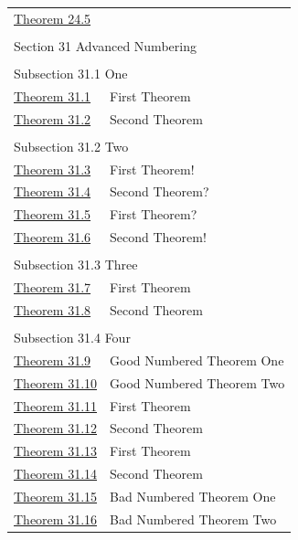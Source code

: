 \documentclass{sn-jnl}
\theoremstyle{thmstyleone}%
\theoremstyle{thmstyletwo}%
\theoremstyle{thmstylethree}%
\numberwithin{equation}{section}
\begin{document}
\begin{appendices}
\begin{longtable}[l]{ll}
\hyperref[theorem-detached]{Theorem 24.5}& \\
\multicolumn{2}{l}{\null}\\[1.5ex] \multicolumn{2}{l}{\large Section 31 Advanced Numbering}\\[0.5ex]
\multicolumn{2}{l}{\null}\\[1.5ex] \multicolumn{2}{l}{\large Subsection 31.1 One}\\[0.5ex]
\hyperref[theorem-number-01]{Theorem 31.1}& First Theorem\\
\hyperref[theorem-number-02]{Theorem 31.2}& Second Theorem\\
\multicolumn{2}{l}{\null}\\[1.5ex] \multicolumn{2}{l}{\large Subsection 31.2 Two}\\[0.5ex]
\hyperref[theorem-number-03]{Theorem 31.3}& First Theorem!\\
\hyperref[theorem-number-04]{Theorem 31.4}& Second Theorem?\\
\hyperref[theorem-number-05]{Theorem 31.5}& First Theorem?\\
\hyperref[theorem-number-06]{Theorem 31.6}& Second Theorem!\\
\multicolumn{2}{l}{\null}\\[1.5ex] \multicolumn{2}{l}{\large Subsection 31.3 Three}\\[0.5ex]
\hyperref[theorem-number-07]{Theorem 31.7}& First Theorem\\
\hyperref[theorem-number-08]{Theorem 31.8}& Second Theorem\\
\multicolumn{2}{l}{\null}\\[1.5ex] \multicolumn{2}{l}{\large Subsection 31.4 Four}\\[0.5ex]
\hyperref[theorem-good-one]{Theorem 31.9}& Good Numbered Theorem One\\
\hyperref[theorem-good-two]{Theorem 31.10}& Good Numbered Theorem Two\\
\hyperref[theorem-number-09]{Theorem 31.11}& First Theorem\\
\hyperref[theorem-number-10]{Theorem 31.12}& Second Theorem\\
\hyperref[theorem-number-11]{Theorem 31.13}& First Theorem\\
\hyperref[theorem-number-12]{Theorem 31.14}& Second Theorem\\
\hyperref[theorem-bad-one]{Theorem 31.15}& Bad Numbered Theorem One\\
\hyperref[theorem-bad-two]{Theorem 31.16}& Bad Numbered Theorem Two\\

\end{longtable}
\end{appendices}
\end{document}
